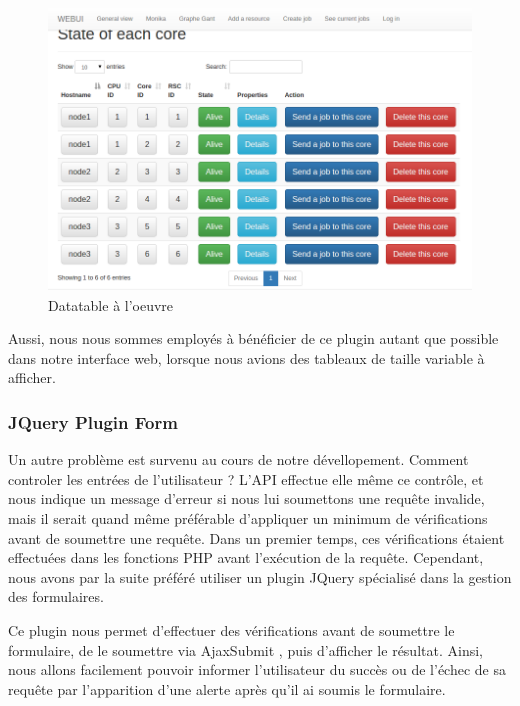 \documentclass[a4paper,10pt]{article}
\begin{document}
\begin{figure}[h]
  \begin{center}
    \includegraphics[scale=0.38]{./all.png}
   \caption{\label{all} Datatable à l'oeuvre}
  \end{center}
\end{figure}

Aussi, nous nous sommes employés à bénéficier de ce plugin autant que possible dans notre interface web, lorsque nous avions des tableaux de taille variable à afficher.
\subsubsection{JQuery Plugin Form}
Un autre problème est survenu au cours de notre dévellopement. Comment controler les entrées de l'utilisateur ? L'API effectue elle même ce contrôle, et nous indique un message d'erreur si nous lui soumettons
une requête invalide, mais il serait quand même préférable d'appliquer un minimum de vérifications avant de soumettre une requête. Dans un premier temps, ces vérifications étaient effectuées dans les fonctions PHP
avant l'exécution de la requête. Cependant, nous avons par la suite préféré utiliser un plugin JQuery spécialisé dans la gestion des formulaires.

Ce plugin nous permet d'effectuer des vérifications avant de soumettre le formulaire, de le soumettre via AjaxSubmit , puis d'afficher le résultat. Ainsi, nous allons facilement pouvoir informer l'utilisateur du succès ou de l'échec de
sa requête par l'apparition d'une alerte après qu'il ai soumis le formulaire.
\end{document}
